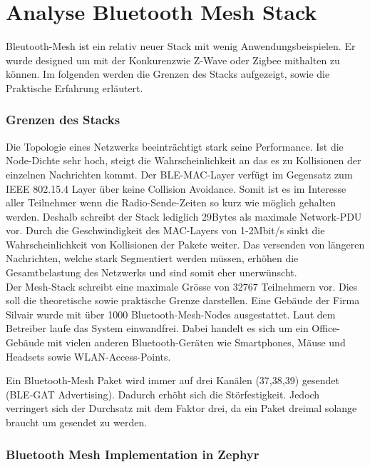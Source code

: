 \clearpage
\section{Analyse Bluetooth Mesh Stack}\label{sec:AnalyseBluetoothMeshStack}

Bleutooth-Mesh ist ein relativ neuer Stack mit wenig Anwendungsbeispielen. Er wurde designed um mit der Konkurenzwie Z-Wave oder Zigbee mithalten zu können. Im folgenden werden die Grenzen des Stacks aufgezeigt, sowie die Praktische Erfahrung erläutert.



\subsubsection{Grenzen des Stacks}\label{subsec:BLEMeshProtokollStack}

Die Topologie eines Netzwerks beeinträchtigt stark seine Performance. Ist die Node-Dichte sehr hoch, steigt die Wahrscheinlichkeit an das es zu Kollisionen der einzelnen Nachrichten kommt. Der BLE-MAC-Layer verfügt im Gegensatz zum IEEE 802.15.4 Layer über keine Collision Avoidance. Somit ist es im Interesse aller Teilnehmer wenn die Radio-Sende-Zeiten so kurz wie möglich gehalten werden. Deshalb schreibt der Stack lediglich 29Bytes als maximale Network-PDU vor. Durch die Geschwindigkeit des MAC-Layers von 1-2Mbit/s sinkt die Wahrscheinlichkeit von Kollisionen der Pakete weiter. Das versenden von längeren Nachrichten, welche stark Segmentiert werden müssen, erhöhen die Gesamtbelastung des Netzwerks und sind somit eher unerwünscht. \cite{bluetooth_sig_mesh_netzwerk_spezifikationen_2020}\\

Der Mesh-Stack schreibt eine maximale Grösse von 32767 Teilnehmern vor. Dies soll die theoretische sowie praktische Grenze darstellen. Eine Gebäude der Firma Silvair wurde mit über 1000 Bluetooth-Mesh-Nodes ausgestattet. Laut dem Betreiber laufe das System einwandfrei. Dabei handelt es sich um ein Office-Gebäude mit vielen anderen Bluetooth-Geräten wie Smartphones, Mäuse und Headsets sowie WLAN-Access-Points.  \cite{woolley_how_bluetooth_mesh_puts_the_large__2018}

Ein Bluetooth-Mesh Paket wird immer auf drei Kanälen (37,38,39) gesendet (BLE-GAT Advertising). Dadurch erhöht sich die Störfestigkeit. Jedoch verringert sich der Durchsatz mit dem Faktor drei, da ein Paket dreimal solange braucht um gesendet zu werden. 

\subsubsection{Bluetooth Mesh Implementation in Zephyr}\label{subsec:BLEMeshProtokollStackZephyr}

